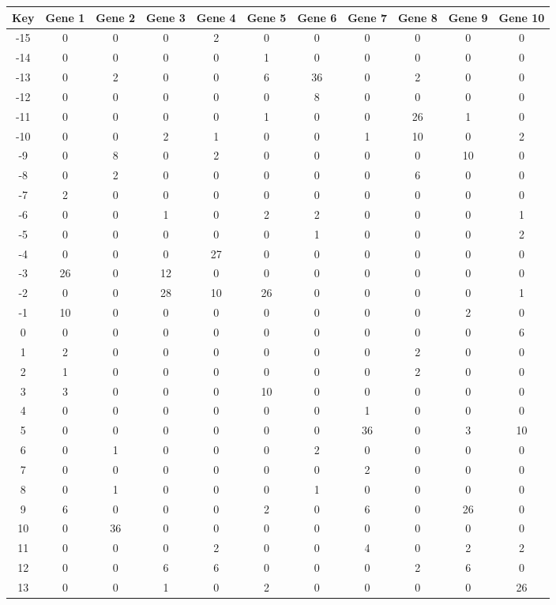 \begin{tabular}{|c|c|c|c|c|c|c|c|c|c|c|}
\hline
Key & Gene 1 & Gene 2 & Gene 3 & Gene 4 & Gene 5 & Gene 6 & Gene 7 & Gene 8 & Gene 9 & Gene 10 \\
\hline
-15 & 0 & 0 & 0 & 2 & 0 & 0 & 0 & 0 & 0 & 0 \\
-14 & 0 & 0 & 0 & 0 & 1 & 0 & 0 & 0 & 0 & 0 \\
-13 & 0 & 2 & 0 & 0 & 6 & 36 & 0 & 2 & 0 & 0 \\
-12 & 0 & 0 & 0 & 0 & 0 & 8 & 0 & 0 & 0 & 0 \\
-11 & 0 & 0 & 0 & 0 & 1 & 0 & 0 & 26 & 1 & 0 \\
-10 & 0 & 0 & 2 & 1 & 0 & 0 & 1 & 10 & 0 & 2 \\
-9 & 0 & 8 & 0 & 2 & 0 & 0 & 0 & 0 & 10 & 0 \\
-8 & 0 & 2 & 0 & 0 & 0 & 0 & 0 & 6 & 0 & 0 \\
-7 & 2 & 0 & 0 & 0 & 0 & 0 & 0 & 0 & 0 & 0 \\
-6 & 0 & 0 & 1 & 0 & 2 & 2 & 0 & 0 & 0 & 1 \\
-5 & 0 & 0 & 0 & 0 & 0 & 1 & 0 & 0 & 0 & 2 \\
-4 & 0 & 0 & 0 & 27 & 0 & 0 & 0 & 0 & 0 & 0 \\
-3 & 26 & 0 & 12 & 0 & 0 & 0 & 0 & 0 & 0 & 0 \\
-2 & 0 & 0 & 28 & 10 & 26 & 0 & 0 & 0 & 0 & 1 \\
-1 & 10 & 0 & 0 & 0 & 0 & 0 & 0 & 0 & 2 & 0 \\
0 & 0 & 0 & 0 & 0 & 0 & 0 & 0 & 0 & 0 & 6 \\
1 & 2 & 0 & 0 & 0 & 0 & 0 & 0 & 2 & 0 & 0 \\
2 & 1 & 0 & 0 & 0 & 0 & 0 & 0 & 2 & 0 & 0 \\
3 & 3 & 0 & 0 & 0 & 10 & 0 & 0 & 0 & 0 & 0 \\
4 & 0 & 0 & 0 & 0 & 0 & 0 & 1 & 0 & 0 & 0 \\
5 & 0 & 0 & 0 & 0 & 0 & 0 & 36 & 0 & 3 & 10 \\
6 & 0 & 1 & 0 & 0 & 0 & 2 & 0 & 0 & 0 & 0 \\
7 & 0 & 0 & 0 & 0 & 0 & 0 & 2 & 0 & 0 & 0 \\
8 & 0 & 1 & 0 & 0 & 0 & 1 & 0 & 0 & 0 & 0 \\
9 & 6 & 0 & 0 & 0 & 2 & 0 & 6 & 0 & 26 & 0 \\
10 & 0 & 36 & 0 & 0 & 0 & 0 & 0 & 0 & 0 & 0 \\
11 & 0 & 0 & 0 & 2 & 0 & 0 & 4 & 0 & 2 & 2 \\
12 & 0 & 0 & 6 & 6 & 0 & 0 & 0 & 2 & 6 & 0 \\
13 & 0 & 0 & 1 & 0 & 2 & 0 & 0 & 0 & 0 & 26 \\
\hline
\end{tabular}